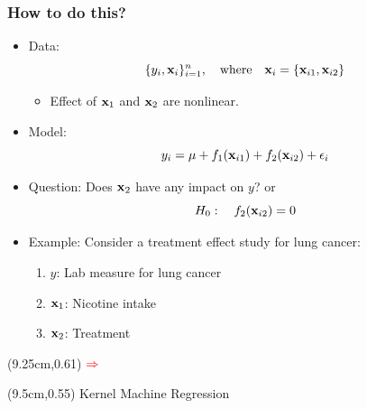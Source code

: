 \documentclass{beamer}
\begin{document}
\begin{frame}
\frametitle{How to do this?}
\begin{itemize}
\item Data: 
$$\{ y_i, {\bf x}_i \}_{i=1}^n, \quad \mbox{where} \quad 
{\bf x}_i= \{{\bf x}_{i1}, {\bf x}_{i2}\}$$
\begin{itemize}
\item Effect of ${\bf x}_1$ and ${\bf x}_2$ are nonlinear.
\end{itemize}
\item Model:
$$y_i=\mu + f_1({\bf x}_{i1})+ f_2({\bf x}_{i2})+\epsilon_i$$
\item Question: Does ${\bf x}_{2}$ have any impact on $y$? or
$$ H_0: \quad f_2({\bf x}_{i2}) = 0$$
\item Example: Consider a treatment effect study for lung cancer:
\begin{enumerate}
\item $y$: Lab measure for lung cancer
\item ${\bf x}_1$: Nicotine intake
\item ${\bf x}_2$: Treatment
\end{enumerate}
\end{itemize}

\begin{textblock*}{0.5cm}(9.25cm,0.61\textheight)
${\color{red} \mathbf{\Rightarrow}}$
\end{textblock*}

\begin{textblock*}{3cm}(9.5cm,0.55\textheight)
\centering
{\color{red} Kernel Machine Regression}
\end{textblock*}
\end{frame}
\end{document}
